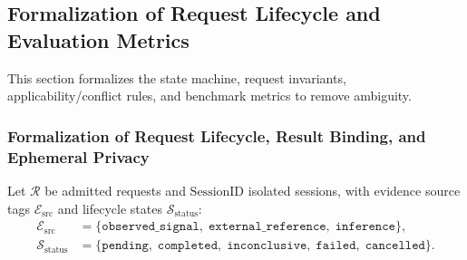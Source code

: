 \documentclass[11pt]{article}
\begin{document}
\subsection{Formalization of Request Lifecycle and Evaluation Metrics}\label{subsec:formalization}

This section formalizes the state machine, request invariants, applicability/conflict rules, and benchmark metrics to remove ambiguity.

\subsubsection{Formalization of Request Lifecycle, Result Binding, and Ephemeral Privacy}

Let $\mathcal{R}$ be admitted requests and $\text{SessionID}$ isolated sessions, with evidence source tags $\mathcal{E}_{\text{src}}$ and lifecycle states $\mathcal{S}_{\text{status}}$:
\begin{align*}
\mathcal{E}_{\text{src}} &= \{\texttt{observed\_signal},\;\texttt{external\_reference},\;\texttt{inference}\}, \\
\mathcal{S}_{\text{status}} &= \{\texttt{pending},\;\texttt{completed},\;\texttt{inconclusive},\;\texttt{failed},\;\texttt{cancelled}\}.
\end{align*}
\end{document}
